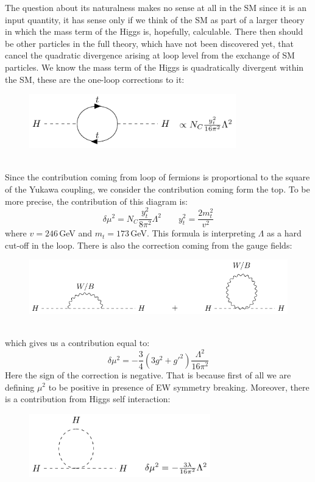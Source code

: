 \documentclass[../main.tex]{subfiles}
\begin{document}
The question about its naturalness makes no sense at all in the SM since it is an input quantity, it has sense only if we think of the SM as part of a larger theory in which the mass term of the Higgs is, hopefully, calculable. There then should be other particles in the full theory, which have not been discovered yet, that cancel the quadratic divergence arising at loop level from the exchange of SM particles. We know the mass term of the Higgs is quadratically divergent within the SM, these are the one-loop corrections to it:
\begin{figure}[h]
    \centering
    \includegraphics[width=0.8\textwidth]{Images/hc1.pdf}
    \caption*{}
\end{figure}\\
Since the contribution coming from loop of fermions is proportional to the square of the Yukawa coupling, we consider the contribution coming form the top. To be more precise, the contribution of this diagram is:
\[
\delta\mu^2=N_C\frac{y_t^2}{8\pi^2}\Lambda^2 \qquad y_t^2=\frac{2m_t^2}{v^2}
\]
where $v=246$\,GeV and $m_t=173$\,GeV. This formula is interpreting $\Lambda$ as a hard cut-off in the loop. There is also the correction coming from the gauge fields:
\begin{figure}[h]
    \centering
    \includegraphics[width=\textwidth]{Images/hc2.pdf}
    \caption*{}
\end{figure}\\
which gives us a contribution equal to:
\[
\delta\mu^2=-\frac{3}{4}(3g^2+g'^2)\frac{\Lambda^2}{16\pi^2}
\]
Here the sign of the correction is negative. That is because first of all we are defining $\mu^2$ to be positive in presence of EW symmetry breaking. Moreover, there is a contribution from Higgs self interaction:
\begin{figure}[h]
    \centering
    \includegraphics[width=0.7\textwidth]{Images/hc3.pdf}
    \caption*{}
\end{figure}\\
\end{document}
